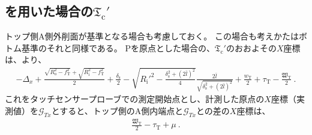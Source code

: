 \clearpage
\modHeadsection{\TopOutcutCenter}


\subsection[\Spacer を用いた場合の\texorpdfstring{$\mathfrak T_\mathrm c'$}{Tc'}]
           {\Spacer を用いた場合の$\boldsymbol{\mathfrak T_\mathrm c'}$}
トップ側A側外削面が基準となる場合も考慮しておく。
この場合も考えかたはボトム基準のそれと同様である。
\TableCenter Pを原点とした場合の、\TopOutcutCenter$\mathfrak T_\mathrm c'$のおおよその$X$座標は、より、
\begin{align*}
  -\Delta_x+\frac{\sqrt{R_\mathrm o^2-f_\mathrm T^2}+\sqrt{R_\mathrm i^2-f_\mathrm T^2}}2+\frac{\delta_\mathrm s}2
  -\sqrt{R_\mathrm i'^2-\frac{\delta_\mathrm s^2+(2\bar l)^2}4}\frac{2\bar l}{\sqrt{\delta_\mathrm s^2+(2\bar l)^2}}
  +\frac{w_\mathrm T}2+\tau_\mathrm T-\frac{\mathfrak W_\mathrm T}2\ .
\end{align*}
これをタッチセンサープローブでの測定開始点とし、計測した原点の$X$座標（実測値）を$\mathcal G_{Tx}$とすると、トップ側のA側内端点と$\mathcal G_{Tx}$との差の$X$座標は、
\begin{align*}
  \frac{\mathfrak W_\mathrm T}2-\tau_\mathrm T+\mu~.
\end{align*}


